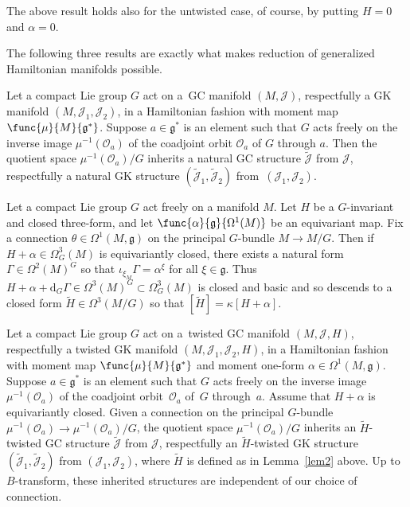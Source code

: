 The above result holds also for the untwisted case, of course, by putting $H=0$ and $\alpha=0$.


The following three results are exactly what makes reduction of generalized Hamiltonian manifolds possible.


\begin{Theorem} \label{thm4}
Let a compact Lie group $G$ act on a~GC manifold $(M,\mathcal{J})$, respectfully a GK manifold $(M,\mathcal{J}_1,\mathcal{J}_2)$, in a Hamiltonian fashion with moment map $\func{\mu}{M}{\mathfrak{g}^*}$.  Suppose $a \in \mathfrak{g}^*$ is an element such that $G$ acts freely on the inverse image $\mu^{-1}(\mathcal{O}_a)$ of the coadjoint orbit $\mathcal{O}_a$ of $G$ through $a$.  Then the quotient space $\mu^{-1}(\mathcal{O}_a) / G$ inherits a natural GC structure $\widetilde{\mathcal{J}}$ from $\mathcal{J}$, respectfully a natural GK structure $(\widetilde{\mathcal{J}}_1,\widetilde{\mathcal{J}}_2)$ from~$(\mathcal{J}_1,\mathcal{J}_2)$.
\end{Theorem}


\begin{Lemma}
\label{lem2}
Let a compact Lie group $G$ act freely on a manifold $M$.  Let $H$ be a $G$-invariant and closed three-form, and let $\func{\alpha}{\mathfrak{g}}{\Omega^1(M)}$ be an equivariant map.  Fix a connection $\theta \in \Omega^1(M, \mathfrak{g})$ on the principal $G$-bundle $M \to M/G$.  Then if $H+\alpha \in \Omega_G^3(M)$ is equivariantly closed, there exists a natural form $\Gamma \in \Omega^2(M)^G$ so that $\iota_{\xi_M} \Gamma = \alpha^{\xi}$ for all $\xi \in \mathfrak{g}$.  Thus $H + \alpha + \mathrm{d}_G \Gamma \in \Omega^3(M)^G \subset \Omega_G^3(M)$ is closed and basic and so descends to a closed form $\widetilde{H} \in \Omega^3(M/G)$ so that $[\widetilde{H}] = \kappa[H+\alpha]$.
\end{Lemma}


\begin{Theorem} \label{thm5}
Let a compact Lie group $G$ act on a~twisted GC manifold $(M,\mathcal{J},H)$, respectfully a twisted GK manifold $(M,\mathcal{J}_1,\mathcal{J}_2,H)$, in a Hamiltonian fashion with moment map $\func{\mu}{M}{\mathfrak{g}^*}$ and moment one-form $\alpha \in \Omega^1(M,\mathfrak{g})$.  Suppose $a \in \mathfrak{g}^*$ is an element such that $G$ acts freely on the inverse image $\mu^{-1}(\mathcal{O}_a)$ of the coadjoint orbit~$\mathcal{O}_a$ of~$G$ through~$a$.  Assume that $H+\alpha$ is equivariantly closed.
Given a connection on the principal $G$-bundle $\mu^{-1}(\mathcal{O}_a) \to \mu^{-1}(\mathcal{O}_a)/G$, the quotient space $\mu^{-1}(\mathcal{O}_a) / G$ inherits an $\widetilde{H}$-twisted GC structure $\widetilde{\mathcal{J}}$ from $\mathcal{J}$, respectfully an $\widetilde{H}$-twisted GK structure $(\widetilde{\mathcal{J}}_1,\widetilde{\mathcal{J}}_2)$ from $(\mathcal{J}_1,\mathcal{J}_2)$, where $\widetilde{H}$ is defined as in Lemma~{\rm \ref{lem2}} above.  Up to $B$-transform, these inherited structures are independent of our choice of connection.
\end{Theorem}


